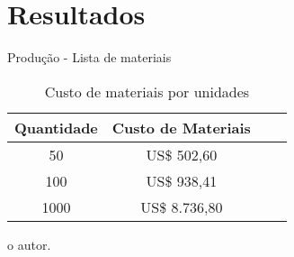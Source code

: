 \section{Resultados}






\begin{frame}{Produção - Lista de materiais}


	\begin{table}[!h]
	\captionsetup{width=9cm}%
	\caption{\label{tab:custos_fabricacao} Custo de materiais por unidades}%
% 	
		\begin{tabular}{cccc}
			\toprule
			Quantidade & Custo de Materiais  \\
			\midrule \midrule
			50 &  US\$ 502,60  \\
			100 &  US\$ 938,41 \\
			1000 & US\$ 8.736,80  \\
			\bottomrule
		\end{tabular}%
	{%
	
    }
    
    \tiny{o autor.}%
    \end{table}    

\end{frame}


